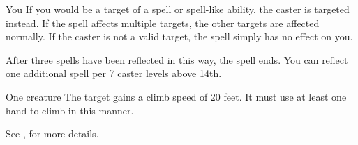 \begin{spellheader}
\end{spellheader}
\begin{spelleffects}
    \begin{spelltarget}{You}
        \spelleffect If you would be a target of a spell or spell-like ability, the caster is targeted instead. If the spell affects multiple targets, the other targets are affected normally. If the caster is not a valid target, the spell simply has no effect on you.

        After three spells have been reflected in this way, the spell ends. You can reflect one additional spell per 7 caster levels above 14th.
    \end{spelltarget}
\end{spelleffects}

\begin{spellheader}
    \spelldur{\durmed}
\end{spellheader}
\begin{spelleffects}
    \begin{spelltarget}{One creature}
        \spelleffect The target gains a climb speed of 20 feet. It must use at least one hand to climb in this manner.
    \end{spelltarget}
\end{spelleffects}
\begin{spellfooter}
    \spellnotes See , for more details.

\end{spellfooter}%

